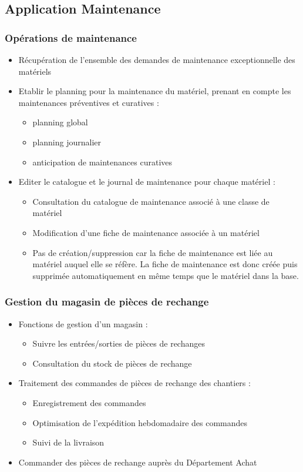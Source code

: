 \subsection{Application Maintenance}
\subsubsection{Opérations de maintenance}
\begin{itemize}
\item Récupération de l'ensemble des demandes de maintenance exceptionnelle
des matériels
\item Etablir le planning pour la maintenance du matériel, prenant en
compte les maintenances préventives et curatives :
    \begin{itemize}
    \item planning global
    \item planning journalier
    \item anticipation de maintenances curatives
    \end{itemize}
\item Editer le catalogue et le  journal de maintenance pour chaque matériel :
    \begin{itemize}
    \item Consultation du catalogue de maintenance associé à une classe de 
    matériel
    \item Modification d'une fiche de maintenance associée à un matériel
    \item Pas de création/suppression car la fiche de maintenance est liée
    au matériel auquel elle se réfère. La fiche de maintenance est donc
    créée puis supprimée automatiquement en même temps que le matériel dans
    la base.
    \end{itemize}
\end{itemize}

\subsubsection{Gestion du magasin de pièces de rechange}
\begin{itemize}
\item Fonctions de gestion d'un magasin :
    \begin{itemize}
    \item Suivre les entrées/sorties de pièces de rechanges
    \item Consultation du stock de pièces de rechange
    \end{itemize}
\item Traitement des commandes de pièces de rechange des chantiers :
    \begin{itemize}
    \item Enregistrement des commandes
    \item Optimisation de l'expédition hebdomadaire des commandes
    \item Suivi de la livraison 
    \end{itemize}
\item Commander des pièces de rechange auprès du Département Achat
\end{itemize}

